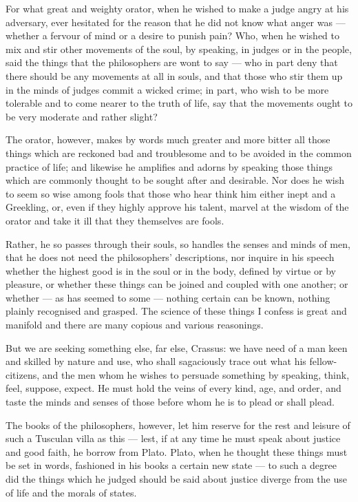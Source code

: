  For what great and weighty orator, when he wished to make a judge angry at his adversary, ever hesitated for the reason that he did not know what anger was — whether a fervour of mind or a desire to punish pain? Who, when he wished to mix and stir other movements of the soul, by speaking, in judges or in the people, said the things that the philosophers are wont to say — who in part deny that there should be any movements at all in souls, and that those who stir them up in the minds of judges commit a wicked crime; in part, who wish to be more tolerable and to come nearer to the truth of life, say that the movements ought to be very moderate and rather slight?

 The orator, however, makes by words much greater and more bitter all those things which are reckoned bad and troublesome and to be avoided in the common practice of life; and likewise he amplifies and adorns by speaking those things which are commonly thought to be sought after and desirable. Nor does he wish to seem so wise among fools that those who hear think him either inept and a Greekling, or, even if they highly approve his talent, marvel at the wisdom of the orator and take it ill that they themselves are fools.

 Rather, he so passes through their souls, so handles the senses and minds of men, that he does not need the philosophers' descriptions, nor inquire in his speech whether the highest good is in the soul or in the body, defined by virtue or by pleasure, or whether these things can be joined and coupled with one another; or whether — as has seemed to some — nothing certain can be known, nothing plainly recognised and grasped. The science of these things I confess is great and manifold and there are many copious and various reasonings.

 But we are seeking something else, far else, Crassus: we have need of a man keen and skilled by nature and use, who shall sagaciously trace out what his fellow-citizens, and the men whom he wishes to persuade something by speaking, think, feel, suppose, expect. He must hold the veins of every kind, age, and order, and taste the minds and senses of those before whom he is to plead or shall plead.

 The books of the philosophers, however, let him reserve for the rest and leisure of such a Tusculan villa as this — lest, if at any time he must speak about justice and good faith, he borrow from Plato. Plato, when he thought these things must be set in words, fashioned in his books a certain new state — to such a degree did the things which he judged should be said about justice diverge from the use of life and the morals of states.

